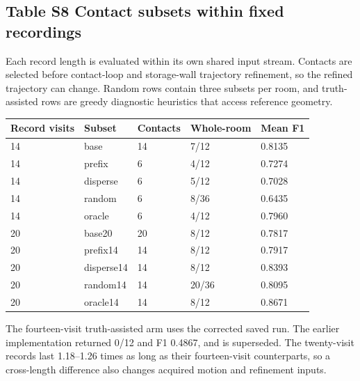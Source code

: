 \documentclass[10pt,letterpaper]{article}
\begin{document}
\begin{minipage}{\linewidth}\subsection*{Table S8 Contact subsets within fixed recordings}


Each record length is evaluated within its own shared input stream.
Contacts are selected before contact-loop and storage-wall trajectory
refinement, so the refined trajectory can change. Random rows contain
three subsets per room, and truth-assisted rows are greedy diagnostic
heuristics that access reference geometry.



\begin{center}\small\begin{tabular}{@{}p{}p{}p{}p{}p{}@{}}\toprule
\textbf{Record visits} & \textbf{Subset} & \textbf{Contacts} & \textbf{Whole-room} & \textbf{Mean F1} \\ \midrule
14 & base & 14 & 7/12 & 0.8135 \\
14 & prefix & 6 & 4/12 & 0.7274 \\
14 & disperse & 6 & 5/12 & 0.7028 \\
14 & random & 6 & 8/36 & 0.6435 \\
14 & oracle & 6 & 4/12 & 0.7960 \\
20 & base20 & 20 & 8/12 & 0.7817 \\
20 & prefix14 & 14 & 8/12 & 0.7917 \\
20 & disperse14 & 14 & 8/12 & 0.8393 \\
20 & random14 & 14 & 20/36 & 0.8095 \\
20 & oracle14 & 14 & 8/12 & 0.8671 \\
\bottomrule\end{tabular}\end{center}
\end{minipage}\par\medskip


The fourteen-visit truth-assisted arm uses the corrected saved run. The
earlier implementation returned 0/12 and F1 0.4867, and is superseded.
The twenty-visit records last 1.18--1.26 times as long as their
fourteen-visit counterparts, so a cross-length difference also changes
acquired motion and refinement inputs.
\end{document}
